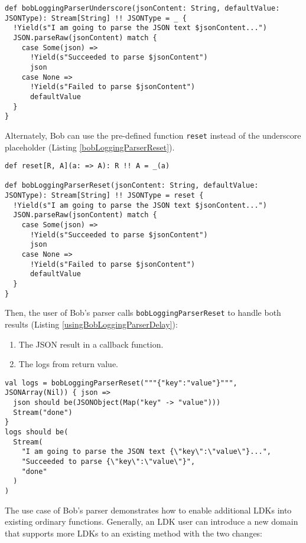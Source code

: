 \begin{lstlisting}[caption={The implementation of Bob's logging parser, the underscore placeholder version},label={bobLoggingParserUnderscore}]
def bobLoggingParserUnderscore(jsonContent: String, defaultValue: JSONType): Stream[String] !! JSONType = _ {
  !Yield(s"I am going to parse the JSON text $jsonContent...")
  JSON.parseRaw(jsonContent) match {
    case Some(json) =>
      !Yield(s"Succeeded to parse $jsonContent")
      json
    case None =>
      !Yield(s"Failed to parse $jsonContent")
      defaultValue
  }
}
\end{lstlisting}

Alternately, Bob can use the pre-defined function \lstinline{reset} instead of the underscore placeholder (Listing \ref{bobLoggingParserReset}).

\begin{lstlisting}[caption={The implementation of Bob's logging parser, the reset version},label={bobLoggingParserReset}]
def reset[R, A](a: => A): R !! A = _(a)

def bobLoggingParserReset(jsonContent: String, defaultValue: JSONType): Stream[String] !! JSONType = reset {
  !Yield(s"I am going to parse the JSON text $jsonContent...")
  JSON.parseRaw(jsonContent) match {
    case Some(json) =>
      !Yield(s"Succeeded to parse $jsonContent")
      json
    case None =>
      !Yield(s"Failed to parse $jsonContent")
      defaultValue
  }
}
\end{lstlisting}

Then, the user of Bob's parser calls \lstinline{bobLoggingParserReset} to handle both results (Listing \ref{usingBobLoggingParserDelay}):

\begin{enumerate}
  \item The JSON result in a callback function.
  \item The logs from return value.
\end{enumerate}

\begin{lstlisting}[caption={Using Bob's parser},label={usingBobLoggingParserDelay}]
val logs = bobLoggingParserReset("""{"key":"value"}""", JSONArray(Nil)) { json =>
  json should be(JSONObject(Map("key" -> "value")))
  Stream("done")
}
logs should be(
  Stream(
    "I am going to parse the JSON text {\"key\":\"value\"}...",
    "Succeeded to parse {\"key\":\"value\"}",
    "done"
  )
)
\end{lstlisting}

The use case of Bob's parser demonstrates how to enable additional LDKs into existing ordinary functions. Generally, an LDK user can introduce a new domain that supports more LDKs to an existing method with the two changes:

